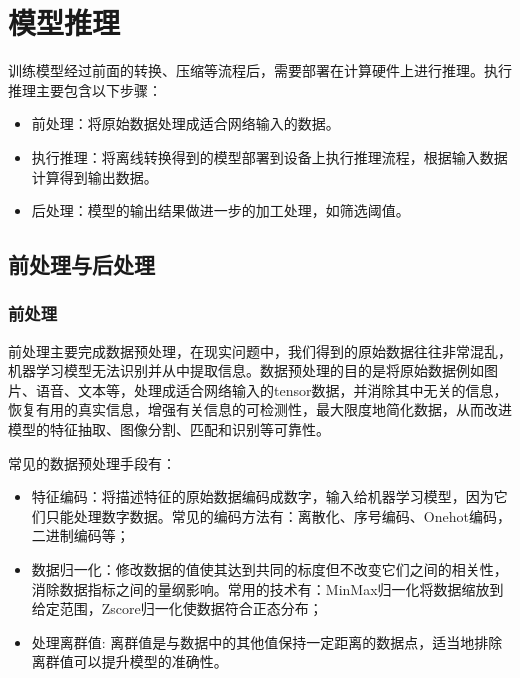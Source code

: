 \documentclass[letterpaper,10pt,english]{sphinxmanual}
\begin{document}
\section{模型推理}
\label{\detokenize{chapter_model_deployment/model_inference:id1}}\label{\detokenize{chapter_model_deployment/model_inference::doc}}
\sphinxAtStartPar
训练模型经过前面的转换、压缩等流程后，需要部署在计算硬件上进行推理。执行推理主要包含以下步骤：
\begin{itemize}
\item {} 
\sphinxAtStartPar
前处理：将原始数据处理成适合网络输入的数据。

\item {} 
\sphinxAtStartPar
执行推理：将离线转换得到的模型部署到设备上执行推理流程，根据输入数据计算得到输出数据。

\item {} 
\sphinxAtStartPar
后处理：模型的输出结果做进一步的加工处理，如筛选阈值。

\end{itemize}


\subsection{前处理与后处理}
\label{\detokenize{chapter_model_deployment/model_inference:id2}}

\subsubsection{前处理}
\label{\detokenize{chapter_model_deployment/model_inference:id3}}
\sphinxAtStartPar
前处理主要完成数据预处理，在现实问题中，我们得到的原始数据往往非常混乱，机器学习模型无法识别并从中提取信息。数据预处理的目的是将原始数据例如图片、语音、文本等，处理成适合网络输入的tensor数据，并消除其中无关的信息，恢复有用的真实信息，增强有关信息的可检测性，最大限度地简化数据，从而改进模型的特征抽取、图像分割、匹配和识别等可靠性。

\sphinxAtStartPar
常见的数据预处理手段有：
\begin{itemize}
\item {} 
\sphinxAtStartPar
特征编码：将描述特征的原始数据编码成数字，输入给机器学习模型，因为它们只能处理数字数据。常见的编码方法有：离散化、序号编码、One\sphinxhyphen{}hot编码，二进制编码等；

\item {} 
\sphinxAtStartPar
数据归一化：修改数据的值使其达到共同的标度但不改变它们之间的相关性，消除数据指标之间的量纲影响。常用的技术有：Min\sphinxhyphen{}Max归一化将数据缩放到给定范围，Z\sphinxhyphen{}score归一化使数据符合正态分布；

\item {} 
\sphinxAtStartPar
处理离群值:
离群值是与数据中的其他值保持一定距离的数据点，适当地排除离群值可以提升模型的准确性。

\end{itemize}
\end{document}
